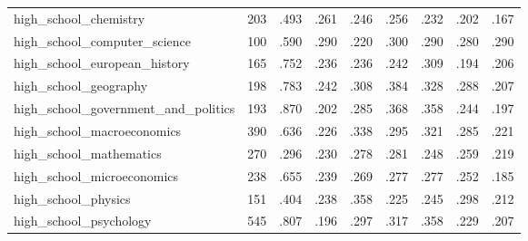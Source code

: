 \begin{table}[t]
\begin{minipage}[t]{.495\textwidth}
{\begin{tabular}{@{}lrrrrrrrr@{}}
high\_school\_chemistry & 203 & .493 & .261 & .246 & .256 & .232 & .202 & .167 \\
high\_school\_computer\_science & 100 & .590 & .290 & .220 & .300 & .290 & .280 & .290 \\
high\_school\_european\_history & 165 & .752 & .236 & .236 & .242 & .309 & .194 & .206 \\
high\_school\_geography & 198 & .783 & .242 & .308 & .384 & .328 & .288 & .207 \\
high\_school\_government\_and\_politics & 193 & .870 & .202 & .285 & .368 & .358 & .244 & .197 \\
high\_school\_macroeconomics & 390 & .636 & .226 & .338 & .295 & .321 & .285 & .221 \\
high\_school\_mathematics & 270 & .296 & .230 & .278 & .281 & .248 & .259 & .219 \\
high\_school\_microeconomics & 238 & .655 & .239 & .269 & .277 & .277 & .252 & .185 \\
high\_school\_physics & 151 & .404 & .238 & .358 & .225 & .245 & .298 & .212 \\
high\_school\_psychology & 545 & .807 & .196 & .297 & .317 & .358 & .229 & .207 \\
\bottomrule
\end{tabular}%
}
\end{minipage}
\hfill
\begin{minipage}[t]{.495\textwidth}
\centering
\setlength{\tabcolsep}{1.5pt}
\end{minipage}
\end{table}
